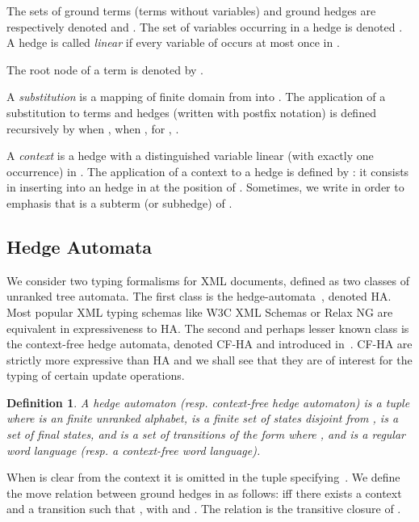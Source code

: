 \documentclass[a4paper]{article}
\theoremstyle{plain}
\newtheorem{definition}{Definition}{\bfseries}{\itshape}
\begin{document}
The sets of ground terms (terms without variables) and ground hedges
are respectively denoted  and .
The set of variables occurring in a hedge  is denoted .
A hedge  is called \emph{linear} if every variable of  occurs at most once in .

\noindent The root node of a term is denoted by .

\medskip{}
A \emph{substitution}  is a mapping of finite domain from  into .
The application of a substitution  to terms and hedges 
(written with postfix notation)
is defined recursively by
 when ,
 when ,
  for ,
.



\medskip{}
A \emph{context} is a hedge 
with a distinguished variable  linear (with exactly one occurrence) in .
The application of a context  to a hedge  
is defined by :
it consists in inserting  into an hedge in  at the position of .
Sometimes, we write  in order to emphasis that  is a subterm (or subhedge) of .




\subsection{Hedge Automata}
We consider two typing formalisms for XML documents,
defined as two classes of unranked tree automata.
The first class is the hedge-automata~\cite{Murata00}, denoted HA.
Most popular XML typing schemas like W3C XML Schemas or Relax NG are equivalent in expressiveness to HA.
The second and perhaps lesser known class is 
the context-free hedge automata, denoted CF-HA and introduced in~\cite{OhsakiST03}. 
CF-HA are strictly more expressive than HA and
we shall see that they are of interest for
the typing of certain update operations.


\begin{definition} \label{def:ha}
A \emph{hedge automaton} (resp. \emph{context-free hedge automaton}) 
is a tuple  
where   is an finite unranked alphabet, 
 is a finite set of states disjoint from ,
 is a set of final states, 
and  is a set of transitions of the form  
where ,  and  is a regular word language 
(resp. a context-free word language). 
\end{definition}
When  is clear from the context it is omitted in the tuple specifying~. 
We define the move relation between ground hedges 
in  as follows: 
 iff there exists a context  
and a transition  such that 
, with  and 
. 
The relation   is the transitive closure of .
\end{document}
